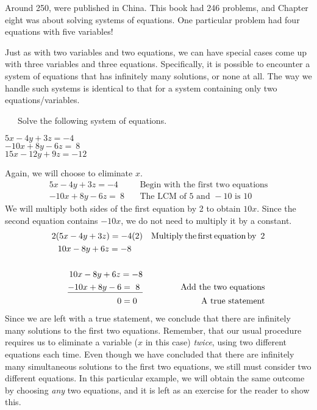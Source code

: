 {} Around 250, {} were published in China. This book had 246 problems, and
Chapter eight was about solving systems of equations. One particular problem had four
equations with five variables!\pp

Just as with two variables and two equations, we can have special cases come
up with three variables and three equations. Specifically, it is possible to encounter a system of equations that has infinitely many solutions, or none at all.  The way we handle such systems is identical to that for a system containing only two equations/variables.

\begin{example}~~~Solve the following system of equations.
\begin{center}
		$5 x - 4 y + 3 z = - 4$\\
		$- 10 x + 8 y - 6 z = ~8~~~~$\\
		$15 x - 12 y + 9 z = - 12$
\end{center}
Again, we will choose to eliminate $x$.
	\begin{eqnarray*}
    5 x - 4 y + 3 z = - 4 &  & \text{Begin~with~the~first~two~equations}\\
		- 10 x + 8 y - 6 z = ~8~& & \text{The~LCM~of~} 5 \text{~and~} -10 \text{~is~} 10%
	\end{eqnarray*}
		We will multiply both sides of the first equation by 2 to obtain $10x$.  Since the second equation contains $-10x$, we do not need to multiply it by a constant.
	\begin{eqnarray*}
    2 (5 x - 4 y + 3 z) = - 4 (2) &  & \operatorname{Multiply} \operatorname{the} \operatorname{first}
    \operatorname{equation} \operatorname{by~} 2\\
    10 x - 8 y + 6 z = - 8~~~~ &  & \\
    &  & \\
    10 x - 8 y + 6 z = - 8 &  & \\
    \underline{- 10 x + 8 y - 6 = ~8~} &  & \text{Add~the~two~equations}\\
    0 = 0~~ &  & \operatorname{A~true~statement}
  \end{eqnarray*}
Since we are left with a true statement, we conclude that there are infinitely many solutions to the first two equations.\pp
Remember, that our usual procedure requires us to eliminate a variable ($x$ in this case) \textit{twice}, using two different equations each time.  Even though we have concluded that there are infinitely many simultaneous solutions to the first two equations, we still must consider two different equations.  In this particular example, we will obtain the same outcome by choosing \textit{any} two equations, and it is left as an exercise for the reader to show this.\\

\end{example}
